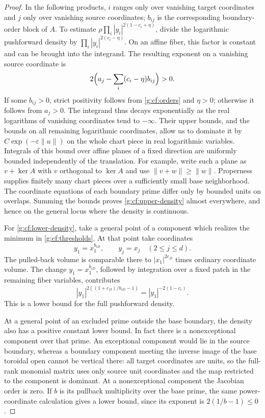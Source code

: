 \begin{proof}
In the following products, $i$ ranges only over vanishing target
coordinates and $j$ only over vanishing source coordinates; $b_{ij}$
is the corresponding boundary-order block of $A$.
To estimate $\rho\prod_i|y_i|^{2(1-c_i+\eta)}$, divide the
logarithmic pushforward density by
$\prod_i|y_i|^{2(c_i-\eta)}$.  On an affine fiber, this factor is
constant and can be brought into the integrand.  The resulting
exponent on a vanishing source coordinate is
\begin{equation}\label{g:cf:residual-exponents}
 2\Bigl(a_j-\sum_i(c_i-\eta)b_{ij}\Bigr)>0.
\end{equation}
If some $b_{ij}>0$, strict positivity follows from
\eqref{g:cf:orders} and $\eta>0$; otherwise it follows from $a_j>0$.
The integrand thus decays exponentially as the real logarithms
of vanishing coordinates tend to $-\infty$.  Their upper bounds,
and the bounds on all remaining logarithmic coordinates, allow
us to dominate it by $C\exp(-\varepsilon\|u\|)$ on the whole
chart piece in real logarithmic variables.  Integrals of this
bound over affine planes of a fixed direction are uniformly
bounded independently of the translation.  For example, write
such a plane as $v+\ker A$ with $v$ orthogonal to $\ker A$ and
use $\|v+w\|\geq\|w\|$.  Properness supplies finitely many
chart pieces over a sufficiently small base neighborhood.  The
coordinate equations of each boundary prime differ only by
bounded units on overlaps.  Summing the bounds proves
\eqref{g:cf:upper-density} almost everywhere, and hence on the
general locus where the density is continuous.

For \eqref{g:cf:lower-density}, take a general point of a component
which realizes the minimum in \eqref{g:cf:thresholds}.  At that point take coordinates
\begin{equation}\label{g:cf:power-chart}
 y_1=x_1^{b_{iD}},\qquad y_j=x_j\quad(2\leq j\leq d).
\end{equation}  The pulled-back volume is
comparable there to $|x_1|^{2e_D}$ times ordinary coordinate
volume.  The change $y_1=x_1^{b_{iD}}$, followed by integration
over a fixed patch in the remaining fiber variables, contributes
\[
 |y_1|^{2((1+e_D)/b_{iD}-1)}
   =|y_1|^{-2(1-c_i)}.
\]
This is a lower bound for the full pushforward density.

At a general point of an excluded prime outside the base boundary,
the density also has a positive constant lower bound.  In fact
there is a nonexceptional component over that prime.  An
exceptional component would lie in the source boundary, whereas
a boundary component meeting the inverse image of the base
toroidal open cannot be vertical there: all target coordinates
are units, so the full-rank monomial matrix uses only source
unit coordinates and the map restricted to the component is
dominant.  At a nonexceptional component the Jacobian order is
zero. If $b$ is its pullback multiplicity over the base prime,
the same power-coordinate calculation gives a lower bound,
since its exponent is $2(1/b-1)\leq0$.
\end{proof}

